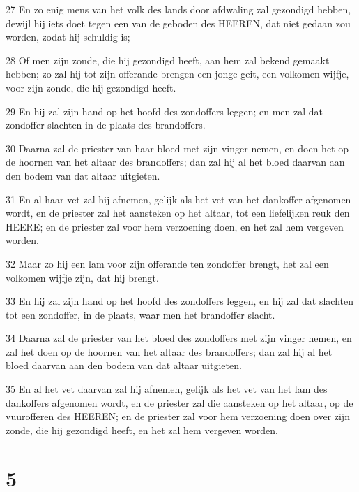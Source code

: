 \par 27 En zo enig mens van het volk des lands door afdwaling zal gezondigd hebben, dewijl hij iets doet tegen een van de geboden des HEEREN, dat niet gedaan zou worden, zodat hij schuldig is;
\par 28 Of men zijn zonde, die hij gezondigd heeft, aan hem zal bekend gemaakt hebben; zo zal hij tot zijn offerande brengen een jonge geit, een volkomen wijfje, voor zijn zonde, die hij gezondigd heeft.
\par 29 En hij zal zijn hand op het hoofd des zondoffers leggen; en men zal dat zondoffer slachten in de plaats des brandoffers.
\par 30 Daarna zal de priester van haar bloed met zijn vinger nemen, en doen het op de hoornen van het altaar des brandoffers; dan zal hij al het bloed daarvan aan den bodem van dat altaar uitgieten.
\par 31 En al haar vet zal hij afnemen, gelijk als het vet van het dankoffer afgenomen wordt, en de priester zal het aansteken op het altaar, tot een liefelijken reuk den HEERE; en de priester zal voor hem verzoening doen, en het zal hem vergeven worden.
\par 32 Maar zo hij een lam voor zijn offerande ten zondoffer brengt, het zal een volkomen wijfje zijn, dat hij brengt.
\par 33 En hij zal zijn hand op het hoofd des zondoffers leggen, en hij zal dat slachten tot een zondoffer, in de plaats, waar men het brandoffer slacht.
\par 34 Daarna zal de priester van het bloed des zondoffers met zijn vinger nemen, en zal het doen op de hoornen van het altaar des brandoffers; dan zal hij al het bloed daarvan aan den bodem van dat altaar uitgieten.
\par 35 En al het vet daarvan zal hij afnemen, gelijk als het vet van het lam des dankoffers afgenomen wordt, en de priester zal die aansteken op het altaar, op de vuurofferen des HEEREN; en de priester zal voor hem verzoening doen over zijn zonde, die hij gezondigd heeft, en het zal hem vergeven worden.

\chapter{5}

